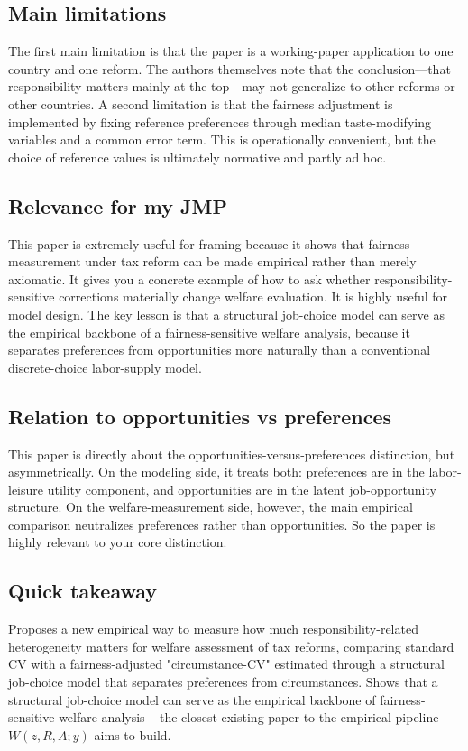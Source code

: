 \documentclass[11pt,a4paper]{article}
\begin{document}
\subsection*{Main limitations}
The first main limitation is that the paper is a working-paper application to one country and one reform. The authors themselves note that the conclusion—that responsibility matters mainly at the top—may not generalize to other reforms or other countries. A second limitation is that the fairness adjustment is implemented by fixing reference preferences through median taste-modifying variables and a common error term. This is operationally convenient, but the choice of reference values is ultimately normative and partly ad hoc.

\subsection*{Relevance for my JMP}
This paper is extremely useful for framing because it shows that fairness measurement under tax reform can be made empirical rather than merely axiomatic. It gives you a concrete example of how to ask whether responsibility-sensitive corrections materially change welfare evaluation. It is highly useful for model design. The key lesson is that a structural job-choice model can serve as the empirical backbone of a fairness-sensitive welfare analysis, because it separates preferences from opportunities more naturally than a conventional discrete-choice labor-supply model.

\subsection*{Relation to opportunities vs preferences}
This paper is directly about the opportunities-versus-preferences distinction, but asymmetrically. On the modeling side, it treats both: preferences are in the labor-leisure utility component, and opportunities are in the latent job-opportunity structure. On the welfare-measurement side, however, the main empirical comparison neutralizes preferences rather than opportunities. So the paper is highly relevant to your core distinction.

\subsection*{Quick takeaway}
Proposes a new empirical way to measure how much responsibility-related heterogeneity matters for welfare assessment of tax reforms, comparing standard CV with a fairness-adjusted "circumstance-CV" estimated through a structural job-choice model that separates preferences from circumstances. Shows that a structural job-choice model can serve as the empirical backbone of fairness-sensitive welfare analysis -- the closest existing paper to the empirical pipeline $W(z,R,A;y)$ aims to build.
\end{document}
